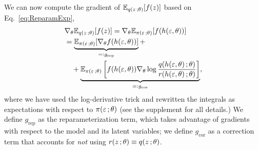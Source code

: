 We can now compute the gradient of $\mathbb{E}_{q(z\, ; \theta)}[f(z)]$ based on Eq.~\ref{eq:ReparamExp},
\begin{align}
\begin{split}
&\nabla_\theta \mathbb{E}_{q(z\, ; \theta)}[f(z)] = \nabla_\theta \mathbb{E}_{\pi(\varepsilon\, ;\theta)}[f(h(\varepsilon,\theta))] \\
&= \underbrace{\mathbb{E}_{\pi(\varepsilon\, ;\theta)}[\nabla_\theta f(h(\varepsilon,\theta))]}_{=: g_{\text{rep}}}+ \\
&\quad + \underbrace{\mathbb{E}_{\pi(\varepsilon\, ;\theta)}\left[ f(h(\varepsilon,\theta)) \nabla_\theta  \log \frac{q(h(\varepsilon,\theta)\, ; \theta)}{r(h(\varepsilon,\theta)\, ; \theta)} \right]}_{=: g_{\text{cor}}},
\end{split}\label{eq:graddef}
\end{align}
where we have used the log-derivative trick and rewritten the integrals as expectations with respect to $\pi(\varepsilon\, ;\theta)$ (see the supplement for all details.) We define $g_{\text{rep}}$ as the reparameterization term, which takes advantage of gradients with respect to the model and its latent variables; we define $g_{\text{cor}}$ as a correction term that accounts for \emph{not} using $r(z\, ; \theta) \equiv q(z\, ; \theta)$.



